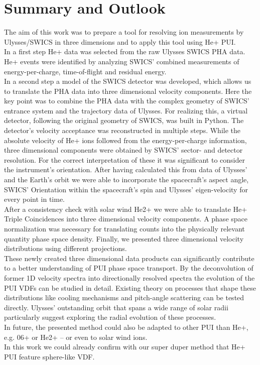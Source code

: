 
\chapter{Summary and Outlook} %

\label{chap:concl} %



The aim of this work was to prepare a tool for resolving ion measurements by Ulysses/SWICS in three dimensions and to apply this tool using He+ PUI.\\
In a first step He+ data was selected from the raw Ulysses SWICS PHA data.
He+ events were identified by analyzing SWICS' combined measurements of energy-per-charge, time-of-flight and residual energy.\\
In a second step a model of the SWICS detector was developed, which allows us to translate the PHA data into three dimensional velocity components.
Here the key point was to combine the PHA data with the complex geometry of SWICS' entrance system and the trajectory data of Ulysses. For realizing this, a virtual detector, following the original geometry of SWICS, was built in Python. 
The detector's velocity acceptance was reconstructed in multiple steps. While the absolute velocity of He+ ions followed from the energy-per-charge information, three dimensional components were obtained by SWICS' sector- and detector resolution. For the correct interpretation of these it was significant to consider the instrument's orientation. After having calculated this from data of Ulysses' and the Earth's orbit we were able to incorporate the spacecraft's aspect angle, SWICS' Orientation within the spacecraft's spin and Ulysses' eigen-velocity for every point in time.\\
After a consistency check with solar wind He2+ we were able to translate He+ Triple Coincidences into three dimensional velocity components.
A phase space normalization was necessary for translating counts into the physically relevant quantity phase space density.
Finally, we presented three dimensional velocity distributions using different projections. 
\\
These newly created three dimensional data products can significantly contribute to a better understanding of PUI phase space transport. By the deconvolution of former 1D velocity spectra into directionally resolved spectra the evolution of the PUI VDFs can be studied in detail.
Existing theory on processes that shape these distributions like cooling mechanisms and pitch-angle scattering can be tested directly.
Ulysses' outstanding orbit that spans a wide range of solar radii particularly suggest exploring the radial evolution of these processes.\\
In future, the presented method could also be adapted to other PUI than He+, e.g. 06+ or He2+ -- or even to solar wind ions. \\
In this work we could already confirm with our super duper method that He+ PUI feature sphere-like VDF.




